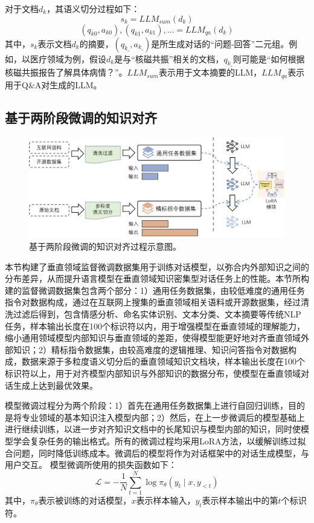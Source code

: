 对于文档$d_k$，其语义切分过程如下：
\begin{equation}
	s_k = LLM_{sum}(d_k)
\end{equation}
\begin{equation}
	(q_{k0}, a_{k0}), (q_{k1}, a_{k1}), \dots = LLM_{qa}(d_k)
\end{equation}
其中，$s_k$表示文档$d_k$的摘要，$(q_{k\_}, a_{k\_})$是所生成对话的“问题-回答”二元组。例如，以医疗领域为例，假设$d_k$是与“核磁共振”相关的文档，$q_{k\_}$则可能是“如何根据核磁共振报告了解具体病情？”。$LLM_{sum}$表示用于文本摘要的LLM，$LLM_{qa}$表示用于Q\&A对生成的LLM。

\subsection{基于两阶段微调的知识对齐}

\begin{figure}[htbp]
	\centering
	\includegraphics[scale=0.6]{Fig/finetune_align_process.png}
	\caption{\label{finetune_align_process}基于两阶段微调的知识对齐过程示意图。}
\end{figure}

本节构建了垂直领域监督微调数据集用于训练对话模型，以弥合内外部知识之间的分布差异，从而提升语言模型在垂直领域知识密集型对话任务上的性能。本节所构建的监督微调数据集包含两个部分：1）通用任务数据集，由较低难度的通用任务指令对数据构成，通过在互联网上搜集的垂直领域相关语料或开源数据集，经过清洗过滤后得到，包含情感分析、命名实体识别、文本分类、文本摘要等传统NLP任务，样本输出长度在100个标识符以内，用于增强模型在垂直领域的理解能力，缩小通用领域模型内部知识与垂直领域的差距，使得模型能更好地对齐垂直领域外部知识；2）精标指令数据集，由较高难度的逻辑推理、知识问答指令对数据构成，数据来源于多粒度语义切分后的垂直领域知识文档块，样本输出长度在100个标识符以上，用于对齐模型内部知识与外部知识的数据分布，使模型在垂直领域对话生成上达到最优效果。

模型微调过程分为两个阶段：1）首先在通用任务数据集上进行自回归训练，目的是将专业领域的基本知识注入模型内部；2）然后，在上一步微调后的模型基础上进行继续训练，以进一步对齐知识文档中的长尾知识与模型内部的知识，同时使模型学会复杂任务的输出格式。所有的微调过程均采用LoRA方法，以缓解训练过拟合问题，同时降低训练成本。微调后的模型将作为对话框架中的对话生成模型，与用户交互。
模型微调所使用的损失函数如下：
\begin{equation}
	\mathcal{L}=-\frac{1}{N} \sum_{t=1}^N \log \pi_\theta\left(y_t \mid x, y_{<t}\right)
\end{equation}
其中，$\pi_\theta$表示被训练的对话模型，$x$表示样本输入，$y_t$表示样本输出中的第$t$个标识符。

